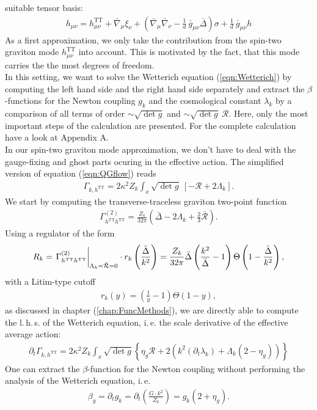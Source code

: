 suitable tensor basis:
\begin{align}
	h_{\mu\nu} = h_{\mu\nu}^{\text{TT}} + \bar{\nabla}_{\mu}\xi_{\nu} + \left(\bar{\nabla}_{\mu}\bar{\nabla}_{\nu} - \frac{1}{d} \ \bar{g}_{\mu\nu}\bar{\Delta}\right)\sigma + \frac{1}{d} \ \bar{g}_{\mu\nu}h
\end{align}
As a first approximation, we only take the contribution from the spin-two graviton mode $h_{\mu\nu}^{\text{TT}}$ into account. This is motivated by the fact, that this mode carries the the most degrees of freedom.\\ %
In this setting, we want to solve the Wetterich equation (\ref{eqn:Wetterich}) by computing the left hand side and the right hand side separately and extract the $\beta$-functions for the Newton coupling $g_k$ and the cosmological constant $\lambda_k$ by a comparison of all terms of order $\sim\sqrt{\operatorname{det}g}$ and $\sim \sqrt{\operatorname{det}g} \ \mathcal{R}$. Here, only the most important steps of the calculation are presented. For the complete calculation have a look at Appendix A. \\%
In our spin-two graviton mode approximation, we don't have to deal with the gauge-fixing and ghost parts ocuring in the effective action. The simplified version of equation (\ref{eqn:QGflow}) reads
\begin{align}
	\Gamma_{k, h^{\text{TT}}} = 2\kappa^2Z_k \int_x \sqrt{\operatorname{det}g} \ [-\mathcal{R} + 2\Lambda_k].
\end{align}
We start by computing the transverse-traceless graviton two-point function
\begin{align}
\Gamma_{h^{\text{TT}}h^{\text{TT}}}^{(2)} = \frac{Z_k}{32\pi}\left(\bar{\Delta} - 2\Lambda_k+\frac{2}{3}\bar{\mathcal{R}}\right).
\end{align}
Using a regulator of the form
\begin{align}
R_k  = \eval{\Gamma_{h^{\text{TT}}h^{\text{TT}}}^{(2)}}_{\Lambda_k=\bar{\mathcal{R}}=0} \cdot r_k\left(\frac{\bar{\Delta}}{k^2}\right) = \frac{Z_k}{32\pi}\bar{\Delta}\left(\frac{k^2}{\bar{\Delta}}-1\right)\Theta\left(1-\frac{\bar{\Delta}}{k^2}\right), \nonumber
\end{align}
with a Litim-type cutoff
\begin{align}
r_k(y) = \left(\frac{1}{y}-1\right)\Theta(1-y), \label{eqn:Litim}
\end{align}
as discussed in chapter (\ref{chap:FuncMethods}), we are directly able to compute the l.\,h.\,s. of the Wetterich equation, i.\,e. the scale derivative of the effective average action:
\begin{align}
	\partial_{t}\Gamma_{k,h^{\text{TT}}} = 2\kappa^2 Z_k\int_x \sqrt{\operatorname{det}g} \left\{\eta_g\mathcal{R}+2\left(k^2(\partial_t\lambda_k) + \Lambda_k(2 - \eta_g)\right)\right\}
\end{align}
One can extract the $\beta$-function for the Newton coupling without performing the analysis of the Wetterich equation, i.\,e. 
\begin{align}
\beta_g = \partial_t g_k = \partial_t\left(\frac{G\cdot k^2}{Z_k}\right) = g_k\left(2+\eta_g\right).
\end{align}

